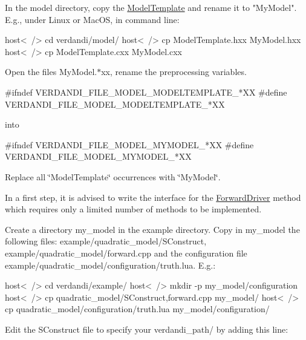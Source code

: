\documentclass{tufte-book}
\begin{document}
\begin{DoxyItemize}
\item \-In the model directory, copy the {\ttfamily  \hyperlink{model_template}{\-Model\-Template}} and rename it to "\-My\-Model". \-E.\-g., under \-Linux or \-Mac\-O\-S, in command line\-:

\begin{frame_bash}
host<~/> cd verdandi/model/
host<~/> cp \-Model\-Template.\-hxx \-My\-Model.\-hxx
host<~/> cp \-Model\-Template.\-cxx \-My\-Model.\-cxx
\end{frame_bash}

\item \-Open the files {\ttfamily \-My\-Model.$\ast$xx}, rename the preprocessing variables.

\begin{frame_cpp}
#ifndef VERDANDI_FILE_MODEL_MODELTEMPLATE_*XX
#define VERDANDI_FILE_MODEL_MODELTEMPLATE_*XX
\end{frame_cpp}

into

\begin{frame_cpp}
#ifndef VERDANDI_FILE_MODEL_MYMODEL_*XX
#define VERDANDI_FILE_MODEL_MYMODEL_*XX
\end{frame_cpp}


\item \-Replace all \char`\"{}\-Model\-Template\char`\"{} occurrences with \char`\"{}\-My\-Model\char`\"{}.


\item \-In a first step, it is advised to write the interface for the \hyperlink{class_verdandi_1_1_forward_driver}{\-Forward\-Driver} method which requires only a limited number of methods to be implemented.

\-Create a directory {\ttfamily my\-\_\-model} in the {\ttfamily example} directory. \-Copy in {\ttfamily my\-\_\-model} the following files\-: {\ttfamily example/quadratic\-\_\-model/\-S\-Construct}, {\ttfamily example/quadratic\-\_\-model/forward.\-cpp} and the configuration file {\ttfamily example/quadratic\-\_\-model/configuration/truth.\-lua}. \-E.\-g.\-:

\begin{frame_bash}
host<~/>  cd verdandi/example/
host<~/> mkdir -p my_model/configuration
host<~/> cp quadratic_model/{SConstruct,forward.cpp} my_model/
host<~/> cp quadratic_model/configuration/truth.lua my_model/configuration/
\end{frame_bash}


\-Edit the {\ttfamily \-S\-Construct} file to specify your {\ttfamily verdandi\-\_\-path/} by adding this line\-:


\end{DoxyItemize}
\end{document}
